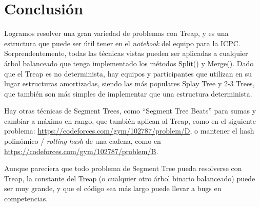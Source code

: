 \section{Conclusión}

Logramos resolver una gran variedad de problemas con Treap, y es una estructura que puede ser útil tener en el \textit{notebook} del equipo para la ICPC.
Sorprendentemente, todas las técnicas vistas pueden ser aplicadas a cualquier árbol balanceado que tenga implementado los métodos Split() y Merge().
Dado que el Treap es no determinista, hay equipos y participantes que utilizan en su lugar estructuras amortizadas, siendo las más populares Splay Tree y 2-3 Trees,
que también son más simples de implementar que una estructura determinista.

Hay otras técnicas de Segment Trees, como ``Segment Tree Beats'' para sumas y cambiar a máximo en rango, que también aplican al Treap, como en el siguiente problema: \url{https://codeforces.com/gym/102787/problem/D}, 
o mantener el hash polinómico / \textit{rolling hash} de una cadena, como en \url{https://codeforces.com/gym/102787/problem/B}.

Aunque pareciera que todo problema de Segment Tree pueda resolverse con Treap,
la constante del Treap (o cualquier otro árbol binario balanceado) puede ser muy grande,
y que el código sea más largo puede llevar a bugs en competencias.